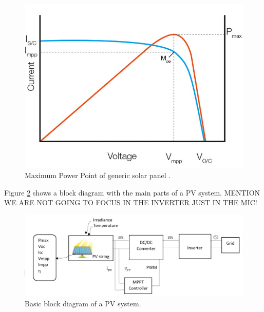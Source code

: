 \begin{figure}[htbp]
	\begin{center}
		\includegraphics[width=0.6\linewidth]{../Pictures/mpp_graph.jpg}
		\caption{Maximum Power Point of generic solar panel \cite{MICintro}.}
		\label{fig:mpp}
	\end{center}
\end{figure}


Figure \ref{fig:PVsystemblocks} shows a block diagram with the main parts of a PV system. MENTION WE ARE NOT GOING TO FOCUS IN THE INVERTER JUST IN THE MIC!

\begin{figure}[htbp]
	\includegraphics[width=\linewidth]{../Pictures/pv_systemPDF}
	\caption{Basic block diagram of a PV system.}
	\label{fig:PVsystemblocks}
\end{figure}


